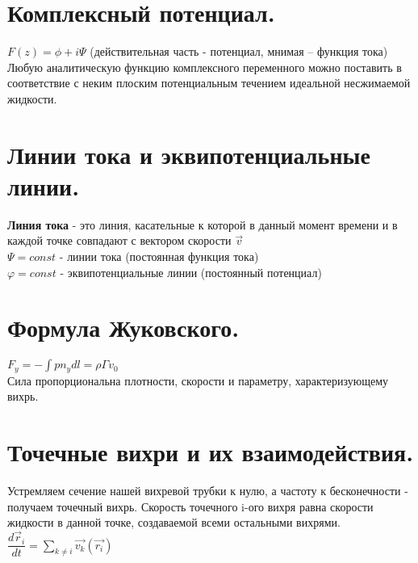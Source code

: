 \begin{multicols*}{2}
		\section{Комплексный потенциал.}
		$F(z)=\phi+i\Psi$ (действительная часть - потенциал, мнимая – функция тока)\\
		Любую аналитическую функцию комплексного переменного можно поставить в соответствие с неким плоским потенциальным течением идеальной несжимаемой жидкости.
		
		\section{Линии тока и эквипотенциальные линии.}
		\textbf{Линия тока} - это линия, касательные к которой в данный момент времени и
		в каждой точке совпадают с вектором скорости  $\vec{v}$ \\
		$\Psi = const$ - линии тока (постоянная функция тока) \\
		$\varphi = const$ - эквипотенциальные линии (постоянный потенциал)
		
		\section{Формула Жуковского.}
		$F_y=-\int pn_ydl=\rho\Gamma v_0$\\
		Сила пропорциональна плотности, скорости и параметру, характеризующему вихрь.
		
		\section{Точечные вихри и их взаимодействия.}
		Устремляем сечение нашей вихревой трубки к нулю, а частоту к бесконечности - получаем точечный вихрь. Скорость точечного i-ого вихря равна скорости жидкости в данной точке, создаваемой всеми остальными вихрями.\\
		$\dfrac{d\vec{r}_i }{dt} = \sum\limits_{k\neq i}{\vec{v_k}(\vec{r_i})}$
		

\end{multicols*}
